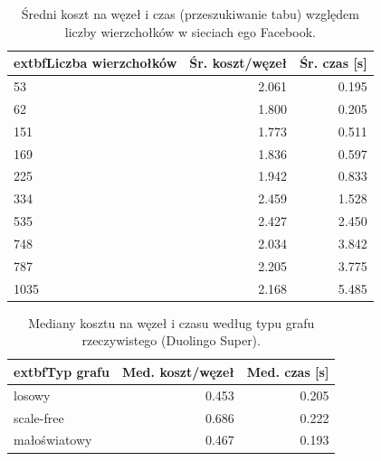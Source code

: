 \begin{table}[H]
  \centering
  \caption{Średni koszt na węzeł i czas (przeszukiwanie tabu) względem liczby wierzchołków w sieciach ego Facebook.}
  \label{tab:duo-real-size-table}
  \begin{tabular}{lrr}
    \toprule
    extbf{Liczba wierzchołków} & \textbf{Śr. koszt/węzeł} & \textbf{Śr. czas [s]} \\
    \midrule
    53                         & 2.061                    & 0.195                 \\
    62                         & 1.800                    & 0.205                 \\
    151                        & 1.773                    & 0.511                 \\
    169                        & 1.836                    & 0.597                 \\
    225                        & 1.942                    & 0.833                 \\
    334                        & 2.459                    & 1.528                 \\
    535                        & 2.427                    & 2.450                 \\
    748                        & 2.034                    & 3.842                 \\
    787                        & 2.205                    & 3.775                 \\
    1035                       & 2.168                    & 5.485                 \\
    \bottomrule
  \end{tabular}
\end{table}

\begin{table}[H]
  \centering
  \caption{Mediany kosztu na węzeł i czasu według typu grafu rzeczywistego (Duolingo Super).}
  \label{tab:duo-real-graph-type}
  \begin{tabular}{lrr}
    \toprule
    extbf{Typ grafu} & \textbf{Med. koszt/węzeł} & \textbf{Med. czas [s]} \\
    \midrule
    losowy           & 0.453                     & 0.205                  \\
    scale-free       & 0.686                     & 0.222                  \\
    małoświatowy     & 0.467                     & 0.193                  \\
    \bottomrule
  \end{tabular}
\end{table}

